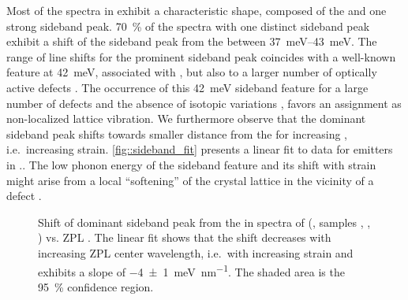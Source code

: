		Most of the spectra in \vl exhibit a characteristic shape, composed of the \ZPL and one strong sideband peak.
		\SI{70}{\percent} of the \pl spectra with one distinct sideband peak exhibit a shift of the sideband peak from the \ZPL between \SIrange{37}{43}{meV}.
		The range of line shifts for the prominent sideband peak coincides with a well-known feature at \SI{42}{meV}, associated with \sivs \cite{Larkins1971,Sternschulte1994}, but also to a larger number of optically active defects \cite{Sternschulte1994}.
		The occurrence of this \SI{42}{meV} sideband feature for a large number of defects and the absence of isotopic variations \cite{Dietrich2014}, favors an assignment as non-localized lattice vibration.
		We furthermore observe that the dominant sideband peak shifts towards smaller distance from the \ZPL for increasing \ZPL \cwl, i.e.\ increasing strain. \autoref{fig::sideband_fit} presents a linear fit to data for emitters in \vl..
		The low phonon energy of the sideband feature and its shift with strain might arise from a local ``softening'' of the crystal lattice in the vicinity of a defect \cite{Sternschulte1994}.

		\begin{figure}[htp]
			\centering
			\caption[Shift of dominant side band peaks for \sivs]{Shift of dominant sideband peak from the \ZPL in spectra of \sivs (\vl, samples \insituF, \insituS, \insituH) vs. ZPL \cwl. The linear fit shows that the shift decreases with increasing ZPL center wavelength, i.e.\ with increasing strain and exhibits a slope of \SI[separate-uncertainty]{-4\pm1}{\milli\electronvolt\per\nano\meter}. The shaded area is the \SI{95}{\percent} confidence region.}
			\label{fig::sideband_fit}
		\end{figure}

